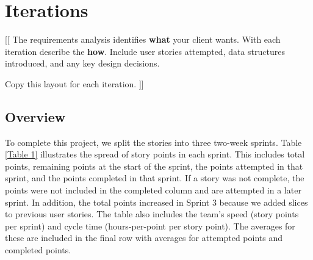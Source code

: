 \section{Iterations}

[[ The requirements analysis identifies \textbf{what} your client wants.
With each iteration describe the \textbf{how}.
Include user stories attempted, data structures introduced, and any key design
decisions.

Copy this layout for each iteration. ]]

\subsection{Overview}

To complete this project, we split the stories into three two-week sprints. Table \ref{Table 1} illustrates the spread of story points in each sprint. This includes total points, remaining points at the start of the sprint, the points attempted in that sprint, and the points completed in that sprint. If a story was not complete, the points were not included in the completed column and are attempted in a later sprint. In addition, the total points increased in Sprint 3 because we added slices to previous user stories. The table also includes the team's speed (story points per sprint) and cycle time (hours-per-point per story point). The averages for these are included in the final row with averages for attempted points and completed points.

\begin{table}[h]
\caption{Project overview}
\label{Table 1}
\end{table}



